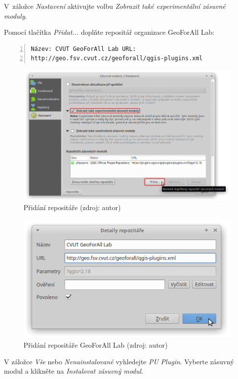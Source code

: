V~záložce \textit{Nastavení} aktivujte volbu \textit{Zobrazit také
experimentální zásuvné moduly}.

Pomocí tlačítka \textit{Přidat...} doplňte repositář organizace
GeoForAll Lab:

\begin{lstlisting}[basicstyle=\footnotesize\ttfamily, backgroundcolor
= \color{light-gray}, numbers=left, columns=fullflexible,
keepspaces=true] Název: CVUT GeoForAll Lab URL:
http://geo.fsv.cvut.cz/geoforall/qgis-plugins.xml
\end{lstlisting}

	\begin{figure}[H] \centering
		\includegraphics[width=.85\textwidth]{./pictures/instalace-pridani_repositare.png}
		\caption[Přidání repositáře]{Přidání repositáře
(zdroj: autor)}
		\label{fig:manual_pridani_repozitare}
 	\end{figure}
 	
	\begin{figure}[H] \centering
		\includegraphics[width=.6\textwidth]{./pictures/instalace-pridani_repositare_geoforall.png}
		\caption[Přidání repositáře GeoForAll Lab]{Přidání
repositáře GeoForAll Lab (zdroj: autor)}
		\label{fig:manual_pridani_repozitare_geoforall_lab}
 	\end{figure}

V záložce \textit{Vše} nebo \textit{Nenainstalované} vyhledejte
\textit{PU Plugin}. Vyberte zásuvný modul a klikněte na
\textit{Instalovat zásuvný modul}.

